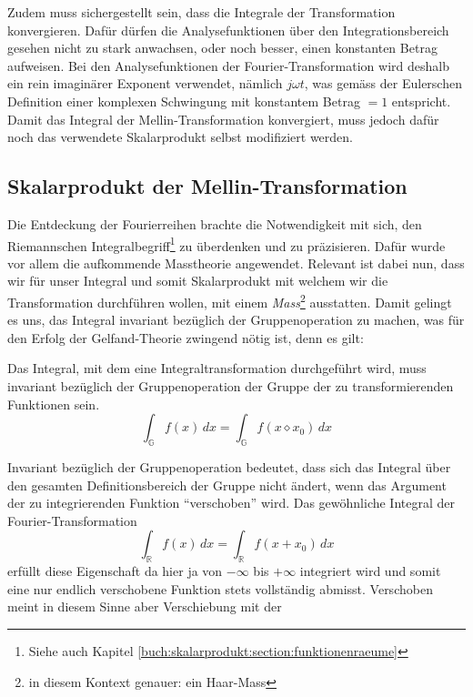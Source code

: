 Zudem muss sichergestellt sein, dass die Integrale der Transformation 
konvergieren.
Dafür dürfen die Analysefunktionen über den Integrationsbereich 
gesehen nicht zu stark anwachsen, oder noch besser, einen konstanten 
Betrag aufweisen. 
Bei den Analysefunktionen der Fourier-Transformation wird deshalb 
ein rein imaginärer Exponent verwendet, nämlich $j\omega t$, was 
gemäss der Eulerschen Definition einer komplexen Schwingung mit 
konstantem Betrag $= 1$ entspricht.
Damit das Integral der Mellin-Transformation konvergiert, muss jedoch 
dafür noch das verwendete Skalarprodukt selbst modifiziert werden.


\subsection{Skalarprodukt der Mellin-Transformation
\label{mellin:subsection:skalarprodukt}}
Die Entdeckung der Fourierreihen brachte die Notwendigkeit mit sich, 
den Riemannschen Integralbegriff\footnote{Siehe auch Kapitel 
\ref{buch:skalarprodukt:section:funktionenraeume}} zu überdenken und 
zu präzisieren.
Dafür wurde vor allem die aufkommende Masstheorie angewendet.
Relevant ist dabei nun, dass wir für unser Integral und somit 
Skalarprodukt mit welchem wir die Transformation durchführen wollen, 
mit einem {\em Mass}\footnote{in diesem Kontext genauer: ein Haar-Mass} 
ausstatten. 
Damit gelingt es uns, das Integral 
invariant bezüglich der Gruppenoperation zu machen, was für den 
Erfolg der Gelfand-Theorie zwingend nötig ist, denn es gilt:
\begin{definition}
    Das Integral, mit dem eine Integraltransformation durchgeführt 
    wird, muss invariant bezüglich der Gruppenoperation der Gruppe 
    der zu transformierenden Funktionen sein.
    \[
        \int_\mathbb{G} f(x)\,{d}x 
        = \int_\mathbb{G} f(x \diamond x_0)\,{d}x
    \]
\end{definition}
Invariant bezüglich der Gruppenoperation bedeutet, dass sich das 
Integral über den gesamten Definitionsbereich der Gruppe nicht ändert, 
wenn das Argument der zu integrierenden Funktion ``verschoben'' wird. 
Das gewöhnliche Integral der Fourier-Transformation 
\begin{equation}
    \int_\mathbb{R} f(x)\,{d}x 
    = \int_\mathbb{R} f(x + x_0)\,{d}x
\end{equation}
erfüllt diese Eigenschaft 
da hier ja von $-\infty$ bis $+\infty$ integriert wird und somit eine 
nur endlich verschobene Funktion stets vollständig abmisst.
Verschoben meint in diesem Sinne aber Verschiebung mit der 
